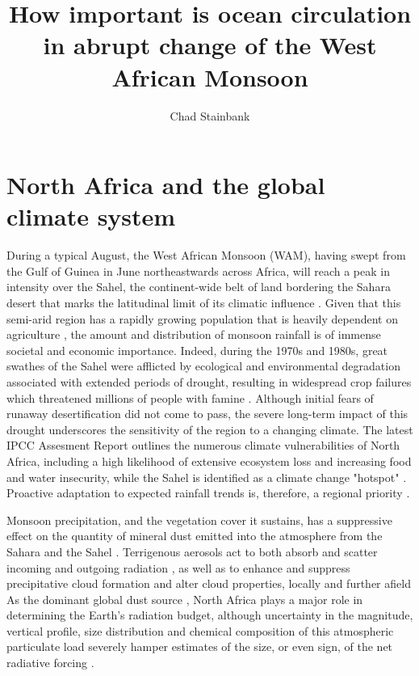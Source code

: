 \documentclass[a4paper]{article}
\begin{document}
\title{How important is ocean circulation in abrupt change of the West African Monsoon}
\author{Chad Stainbank}
\maketitle

\section{North Africa and the global climate system}
\label{sec:sahelwam}
During a typical August, the West African Monsoon (WAM), having swept from the Gulf of Guinea in June northeastwards across Africa, will reach a peak in intensity over the Sahel, the continent-wide belt of land bordering the Sahara desert that marks the latitudinal limit of its climatic influence \parencite{sultan2003west2, nicholson2013west}.
Given that this semi-arid region has a rapidly growing population that is heavily dependent on agriculture \parencite{sissoko2011agriculture}, the amount and distribution of monsoon rainfall is of immense societal and economic importance.
Indeed, during the 1970s and 1980s, great swathes of the Sahel were afflicted by ecological and environmental degradation associated with extended periods of drought, resulting in widespread crop failures which threatened millions of people with famine \parencite{benson1998impact, olsson1993causes, walther2016review}.
Although initial fears of runaway desertification \parencite{charney1975dynamics, charney1975drought} did not come to pass, the severe long-term impact of this drought underscores the sensitivity of the region to a changing climate.
The latest IPCC Assesment Report \parencite{ipcc2014impacts} outlines the numerous climate vulnerabilities of North Africa, including a high likelihood of extensive ecosystem loss and increasing food and water insecurity, while the Sahel is identified as a climate change "hotspot" \parencite{diffenbaugh2012climate}.
Proactive adaptation to expected rainfall trends is, therefore, a regional priority \parencite{lobell2008prioritizing, sarr2012present}.

Monsoon precipitation, and the vegetation cover it sustains, has a suppressive effect on the quantity of mineral dust emitted into the atmosphere from the Sahara and the Sahel \parencite{brooks2000dust, cowie2013vegetation}.
Terrigenous aerosols act to both absorb and scatter incoming and outgoing radiation \parencite{andreae1995climatic, tegen1996influence, haywood2000estimates}, as well as to enhance and suppress precipitative cloud formation and alter cloud properties, locally and further afield \parencite{rosenfeld2001desert, demott2003african, huang2006possible, karydis2011effect}  
As the dominant global dust source \parencite{tanaka2006numerical}, North Africa plays a major role in determining the Earth's radiation budget, although uncertainty in the magnitude, vertical profile, size distribution and chemical composition of this atmospheric particulate load severely hamper estimates of the size, or even sign, of the net radiative forcing \parencite{claquin1998uncertainties, sokolik2001introduction, durant2009sensitivity}.
\end{document}
